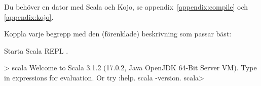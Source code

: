 
\ifPreSolution
\Exercise{\ExeWeekONE}\label{exe:W01}

\begin{Goals}

\end{Goals}

\begin{Preparations}
\item {}
\item Du behöver en dator med Scala och Kojo, se appendix~\ref{appendix:compile} och  \ref{appendix:kojo}.
\end{Preparations}

\else

\ExerciseSolution{\ExeWeekONE}

\fi  %

\vfill\pagebreak

\BasicTasks





\QUESTBEGIN

\Task \what

\vspace{1em}\noindent Koppla varje begrepp med den (förenklade) beskrivning som passar bäst:

\begin{ConceptConnections}

\end{ConceptConnections}

\SOLUTION

\TaskSolved \what

\begin{ConceptConnections}

\end{ConceptConnections}

\QUESTEND







\QUESTBEGIN

\Task \what

\vspace{1em}\noindent Starta Scala REPL .

\begin{REPLnonum}
> scala
Welcome to Scala 3.1.2 (17.0.2, Java OpenJDK 64-Bit Server VM).
Type in expressions for evaluation. Or try :help.
scala -version.
scala>
\end{REPLnonum}

